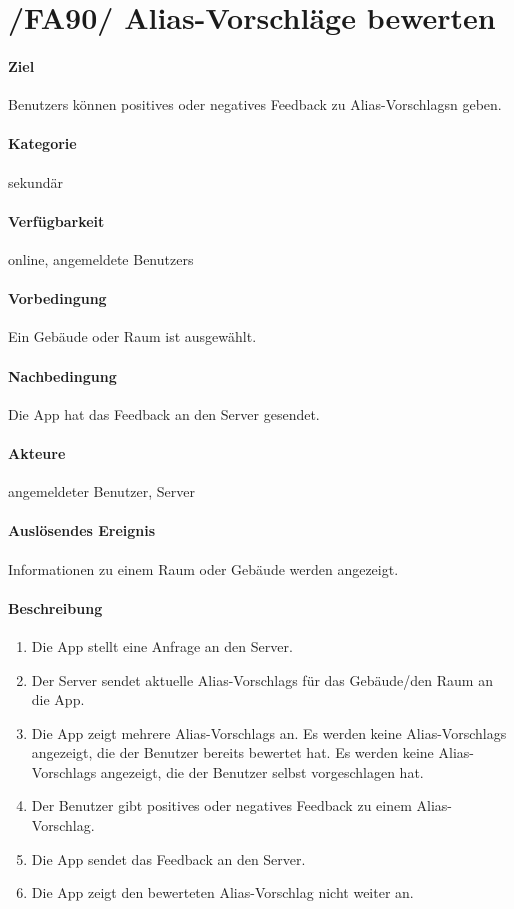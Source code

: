 \section{/FA90/ Alias-Vorschläge bewerten}
\label{Aliasbewertungsfunktion}
\label{/FA90/}
\paragraph{Ziel}
\Glspl{Benutzer} können positives oder negatives Feedback zu \Glspl{Alias-Vorschlag}n geben.
\paragraph{Kategorie}
sekundär
\paragraph{Verfügbarkeit}
online, angemeldete \Glspl{Benutzer}
\paragraph{Vorbedingung}
Ein Gebäude oder Raum ist ausgewählt.
\paragraph{Nachbedingung}
Die App hat das Feedback an den \Gls{Server} gesendet.
\paragraph{Akteure}
angemeldeter \Gls{Benutzer}, \Gls{Server}
\paragraph{Auslösendes Ereignis}
Informationen zu einem Raum oder Gebäude werden angezeigt.
\paragraph{Beschreibung}
\begin{enumerate}
    \item Die App stellt eine Anfrage an den \Gls{Server}.
    \item Der \Gls{Server} sendet aktuelle \Glspl{Alias-Vorschlag} für das Gebäude/den Raum an die App.
    \item Die App zeigt mehrere \Glspl{Alias-Vorschlag} an. Es werden keine \Glspl{Alias-Vorschlag} angezeigt, die der \Gls{Benutzer} bereits bewertet hat. Es werden keine \Glspl{Alias-Vorschlag} angezeigt, die der \Gls{Benutzer} selbst vorgeschlagen hat.
    \item Der \Gls{Benutzer} gibt positives oder negatives Feedback zu einem \Gls{Alias-Vorschlag}.
    \item Die App sendet das Feedback an den \Gls{Server}.
    \item Die App zeigt den bewerteten \Gls{Alias-Vorschlag} nicht weiter an.
\end{enumerate}